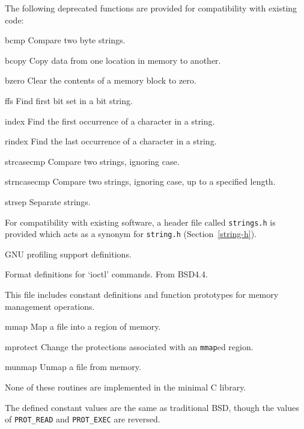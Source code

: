 \begin{apidesc}
	The following deprecated functions are provided
	for compatibility with existing code:
	\begin{icsymlist}
	\item[bcmp]
		Compare two byte strings.
	\item[bcopy]
		Copy data from one location in memory to another.
	\item[bzero]
		Clear the contents of a memory block to zero.
	\item[ffs]
		Find first bit set in a bit string.
	\item[index]
		Find the first occurrence of a character in a string.
	\item[rindex]
		Find the last occurrence of a character in a string.
	\item[strcasecmp]
		Compare two strings, ignoring case.
	\item[strncasecmp]
		Compare two strings, ignoring case, up to a specified length.
	\item[strsep]
		Separate strings.
	\end{icsymlist}
\end{apidesc}

\label{strings-h}
\begin{apidesc}
	For compatibility with existing software,
	a header file called {\tt strings.h} is provided
	which acts as a synonym for {\tt string.h} (Section~\ref{string-h}).
\end{apidesc}

\label{sys-gmon-h}
\begin{apidesc}
	GNU profiling support definitions.
\end{apidesc}

\label{sys-ioctl-h}
\begin{apidesc}
	Format definitions for `ioctl' commands.  From BSD4.4.
\end{apidesc}

\label{sys-mman-h}
\begin{apidesc}
	This file includes constant definitions and function prototypes for
	memory management operations.
	\begin{icsymlist}
		\item[mmap]
			Map a file into a region of memory.
		\item[mprotect]
			Change the protections associated with an
			{\tt mmap}ed region.
		\item[munmap]
			Unmap a file from memory.
	\end{icsymlist}
	None of these routines are implemented in the minimal C library.

	The defined constant values are the same as traditional BSD,
	though the values of {\tt PROT_READ} and {\tt PROT_EXEC} are reversed.
\end{apidesc}

